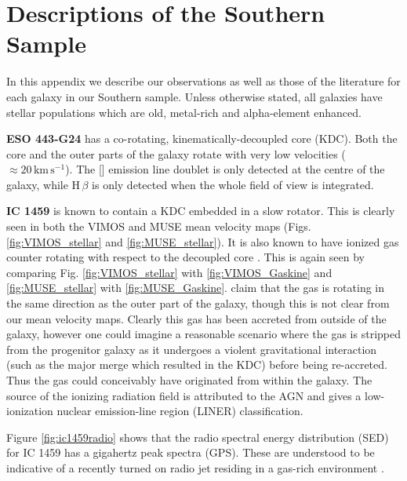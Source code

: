 \chapter{Descriptions of the Southern Sample}
	\label{cha:Description}
In this appendix we describe our observations as well as those of the literature for each galaxy in our Southern sample. Unless otherwise stated, all galaxies have stellar populations which are old, metal-rich and alpha-element enhanced.

\textbf{ESO 443-G24} has a co-rotating, kinematically-decoupled core (KDC). Both the core and the outer parts of the galaxy rotate with very low velocities ($\approx 20\,\mathrm{km\,s^{-1}}$). The [] emission line doublet is only detected at the centre of the galaxy, while H\,$\beta$ is only detected when the whole field of view is integrated. 

\textbf{IC 1459} is known to contain a KDC \citep{Franx1988} embedded in a slow rotator. This is clearly seen in both the VIMOS and MUSE mean velocity maps (Figs. \ref{fig:VIMOS_stellar} and \ref{fig:MUSE_stellar}). It is also known to have ionized gas counter rotating with respect to the decoupled core \citep{VerdoesKleijn2000}. This is again seen by comparing Fig. \ref{fig:VIMOS_stellar} with \ref{fig:VIMOS_Gaskine} and \ref{fig:MUSE_stellar} with \ref{fig:MUSE_Gaskine}. \citet{Franx1988} claim that the gas is rotating in the same direction as the outer part of the galaxy, though this is not clear from our mean velocity maps. Clearly this gas has been accreted from outside of the galaxy, however one could imagine a reasonable scenario where the gas is stripped from the progenitor galaxy as it undergoes a violent gravitational interaction (such as the major merge which resulted in the KDC) before being re-accreted. Thus the gas could conceivably have originated from within the galaxy. The source of the ionizing radiation field is attributed to the AGN and gives a low-ionization nuclear emission-line region (LINER) classification.

Figure \ref{fig:ic1459radio} shows that the radio spectral energy distribution (SED) for IC 1459 has a gigahertz peak spectra (GPS). These are understood to be indicative of a recently turned on radio jet residing in a gas-rich environment \citep[e.g.][]{ODea1998}. 

